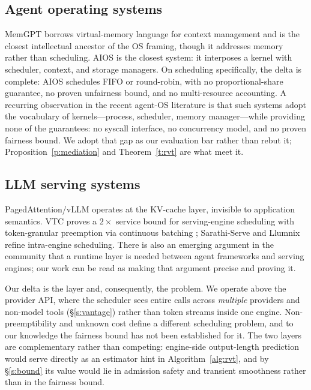 \documentclass[letterpaper,11pt,leqno]{article}
\begin{document}
\subsection{Agent operating systems}\label{s:rel-agentos}

MemGPT \citep{Packer23} borrows virtual-memory language for context management and is the closest intellectual ancestor of the OS framing, though it addresses memory rather than scheduling. AIOS \citep{Mei25, Ge23} is the closest system: it interposes a kernel with scheduler, context, and storage managers. On scheduling specifically, the delta is complete: AIOS schedules FIFO or round-robin, with no proportional-share guarantee, no proven unfairness bound, and no multi-resource accounting. A recurring observation in the recent agent-OS literature is that such systems adopt the vocabulary of kernels---process, scheduler, memory manager---while providing none of the guarantees: no syscall interface, no concurrency model, and no proven fairness bound. We adopt that gap as our evaluation bar rather than rebut it; Proposition~\ref{p:mediation} and Theorem~\ref{t:rvt} are what meet it.

\subsection{LLM serving systems}\label{s:rel-serving}

PagedAttention/vLLM \citep{Kwon23} operates at the KV-cache layer, invisible to application semantics. VTC \citep{Sheng24} proves a $2\times$ service bound for serving-engine scheduling with token-granular preemption via continuous batching \citep{Yu22}; Sarathi-Serve \citep{Agrawal24} and Llumnix \citep{Sun24} refine intra-engine scheduling. There is also an emerging argument in the community that a runtime layer is needed between agent frameworks and serving engines; our work can be read as making that argument precise and proving it.

Our delta is the layer and, consequently, the problem. We operate above the provider API, where the scheduler sees entire calls across \emph{multiple} providers and non-model tools (\S\ref{s:vantage}) rather than token streams inside one engine. Non-preemptibility and unknown cost define a different scheduling problem, and to our knowledge the fairness bound has not been established for it. The two layers are complementary rather than competing: engine-side output-length prediction would serve directly as an estimator hint in Algorithm~\ref{alg:rvt}, and by \S\ref{s:bound} its value would lie in admission safety and transient smoothness rather than in the fairness bound.
\end{document}
